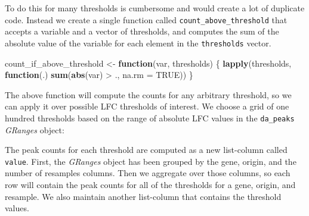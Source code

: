 \documentclass[
]{article}
\newenvironment{Shaded}{}{}
\newcommand{\ControlFlowTok}[1]{\textcolor[rgb]{0.00,0.44,0.13}{\textbf{#1}}}
\newcommand{\DataTypeTok}[1]{\textcolor[rgb]{0.56,0.13,0.00}{#1}}
\newcommand{\DecValTok}[1]{\textcolor[rgb]{0.25,0.63,0.44}{#1}}
\newcommand{\KeywordTok}[1]{\textcolor[rgb]{0.00,0.44,0.13}{\textbf{#1}}}
\newcommand{\NormalTok}[1]{#1}
\newcommand{\OperatorTok}[1]{\textcolor[rgb]{0.40,0.40,0.40}{#1}}
\newcommand{\OtherTok}[1]{\textcolor[rgb]{0.00,0.44,0.13}{#1}}
\newcommand{\StringTok}[1]{\textcolor[rgb]{0.25,0.44,0.63}{#1}}
\begin{document}
To do this for many thresholds is cumbersome and would create a lot of
duplicate code. Instead we create a single function called
\texttt{count\_above\_threshold} that accepts a variable and a vector of thresholds, and
computes the sum of the absolute value of the variable for each element in the
\texttt{thresholds} vector.

\begin{Shaded}
\begin{Highlighting}[]
\NormalTok{count_if_above_threshold <-}\StringTok{ }\ControlFlowTok{function}\NormalTok{(var, thresholds) \{}
  \KeywordTok{lapply}\NormalTok{(thresholds, }\ControlFlowTok{function}\NormalTok{(.) }\KeywordTok{sum}\NormalTok{(}\KeywordTok{abs}\NormalTok{(var) }\OperatorTok{>}\StringTok{ }\NormalTok{., }\DataTypeTok{na.rm =} \OtherTok{TRUE}\NormalTok{))}
\NormalTok{\}}
\end{Highlighting}
\end{Shaded}

The above function will compute the counts for any arbitrary threshold, so we
can apply it over possible LFC thresholds of interest. We choose a grid of one
hundred thresholds based on the range of absolute LFC values in the \texttt{da\_peaks}
\emph{GRanges} object:

\begin{Shaded}
\end{Shaded}

The peak counts for each threshold are computed as a new list-column called
\texttt{value}. First, the \emph{GRanges} object has been grouped by the gene, origin, and
the number of resamples columns. Then we aggregate over those columns, so each
row will contain the peak counts for all of the thresholds for a gene, origin,
and resample. We also maintain another list-column that contains the threshold
values.

\begin{Shaded}
\end{Shaded}
\end{document}
